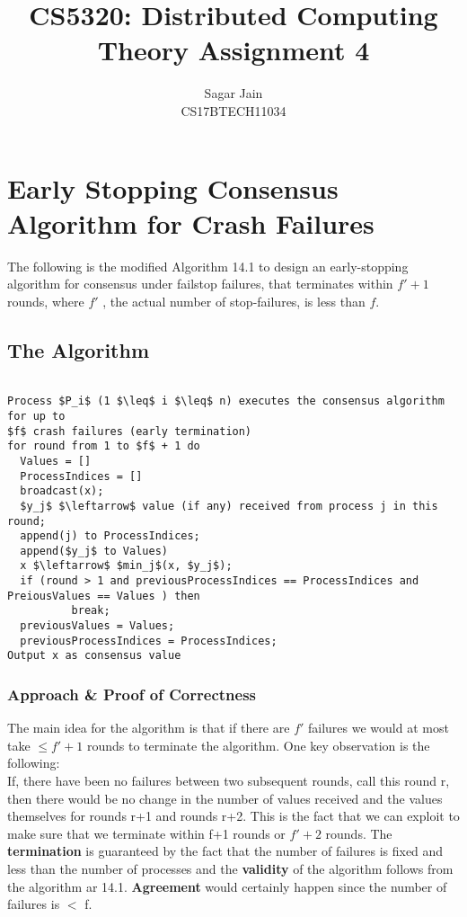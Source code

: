 \documentclass[12pt]{article}
\begin{document}
\title{CS5320: Distributed Computing\\Theory Assignment 4}
\author{Sagar Jain\\CS17BTECH11034}
\maketitle
\section{Early Stopping Consensus Algorithm for Crash Failures}
The following is the modified Algorithm 14.1 to design an early-stopping algorithm
for consensus under failstop failures, that terminates within $f' + 1$ rounds, where $f'$ , the actual number of stop-failures, is less than $f$.

\subsection{The Algorithm}

\begin{lstlisting}[mathescape=true]

Process $P_i$ (1 $\leq$ i $\leq$ n) executes the consensus algorithm for up to
$f$ crash failures (early termination)
for round from 1 to $f$ + 1 do
  Values = []
  ProcessIndices = []
  broadcast(x);
  $y_j$ $\leftarrow$ value (if any) received from process j in this round;
  append(j) to ProcessIndices;
  append($y_j$ to Values)
  x $\leftarrow$ $min_j$(x, $y_j$);
  if (round > 1 and previousProcessIndices == ProcessIndices and PreiousValues == Values ) then 
          break;
  previousValues = Values;
  previousProcessIndices = ProcessIndices;
Output x as consensus value
\end{lstlisting}

\subsubsection{Approach \& Proof of Correctness}
The main idea for the algorithm is that if there are $f'$ failures we would at most take $ \leq f' + 1$ rounds to terminate the algorithm. One key observation is the following:\\
If, there have been no failures between two subsequent rounds, call this round r, then there would be no change in the number of values received and the values themselves for rounds r+1 and rounds r+2. This is the fact that we can exploit to make sure that we terminate within f+1 rounds or $f' + 2$ rounds. The \textbf{termination} is guaranteed by the fact that the number of failures is fixed and less than the number of processes and the \textbf{validity} of the algorithm follows from the algorithm ar 14.1. \textbf{Agreement} would certainly happen since the number of failures is $<$ f.
\end{document}
